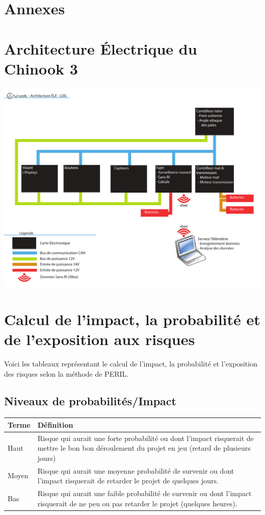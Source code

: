 \documentclass[11pt]{article}
\begin{document}
\section*{Annexes}
\begin{appendices}


\section{Architecture Électrique du Chinook 3}
\label{sec:archELE}
\includegraphics[height=1\textwidth,angle=90]{images/Architecture_ÉLÉ-LOG.pdf}

\clearpage
\section{Calcul de l'impact, la probabilité et de l'exposition aux risques}
\label{annexePERIL}
Voici les tableaux représentant le calcul de l'impact, la probabilité et l'exposition des risques selon la méthode de PERIL.

\subsection{Niveaux de probabilités/Impact}


\begin{tabu} to \linewidth {lX}
  \textbf{Terme} & \textbf{Définition} \\
  \hline
  Haut & Risque qui aurait une forte probabilité ou dont l'impact risquerait de mettre le bon bon déroulement du projet en jeu (retard de plusieurs jours) \\
  Moyen & Risque qui aurait une moyenne probabilité de survenir ou dont l'impact risquerait de retarder le projet de quelques jours.\\
  Bas & Risque qui aurait une faible probabilité de survenir ou dont l'impact risquerait de ne peu ou pas retarder le projet (quelques heures). 
\end{tabu}


\end{appendices}
\end{document}
